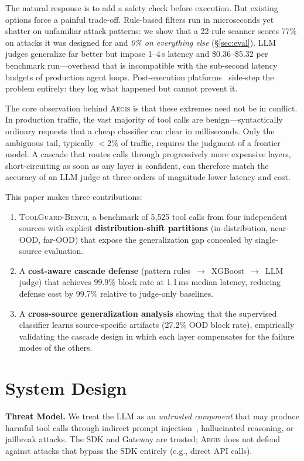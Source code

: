 \documentclass{article}
\newcommand{\system}{\textsc{Aegis}\xspace}
\newcommand{\bench}{\textsc{ToolGuard-Bench}\xspace}
\begin{document}
The natural response is to add a safety check before execution.
But existing options force a painful trade-off.
Rule-based filters run in microseconds yet shatter on unfamiliar attack patterns: we show that a 22-rule scanner scores 77\% on attacks it was designed for and \emph{0\% on everything else} (\S\ref{sec:eval}).
LLM judges generalize far better but impose 1--4\,s latency and \$0.36--\$5.32 per benchmark run---overhead that is incompatible with the sub-second latency budgets of production agent loops.
Post-execution platforms~\citep{langfuse2024,arize2024} side-step the problem entirely: they log what happened but cannot prevent it.

The core observation behind \system is that these extremes need not be in conflict.
In production traffic, the vast majority of tool calls are benign---syntactically ordinary requests that a cheap classifier can clear in milliseconds.
Only the ambiguous tail, typically $<$2\% of traffic, requires the judgment of a frontier model.
A cascade that routes calls through progressively more expensive layers, short-circuiting as soon as any layer is confident, can therefore match the accuracy of an LLM judge at three orders of magnitude lower latency and cost.

This paper makes three contributions:
\begin{enumerate}[nolistsep,leftmargin=*]
\item \bench, a benchmark of 5{,}525 tool calls from four independent sources with explicit \textbf{distribution-shift partitions} (in-distribution, near-OOD, far-OOD) that expose the generalization gap concealed by single-source evaluation.
\item A \textbf{cost-aware cascade defense} (pattern rules~$\to$~XGBoost~$\to$~LLM judge) that achieves 99.9\% block rate at 1.1\,ms median latency, reducing defense cost by 99.7\% relative to judge-only baselines.
\item A \textbf{cross-source generalization analysis} showing that the supervised classifier learns source-specific artifacts (27.2\% OOD block rate), empirically validating the cascade design in which each layer compensates for the failure modes of the others.
\end{enumerate}

\section{System Design}
\label{sec:arch}

\textbf{Threat Model.}
We treat the LLM as an \emph{untrusted component} that may produce harmful tool calls through indirect prompt injection~\citep{greshake2023not}, hallucinated reasoning, or jailbreak attacks.
The SDK and Gateway are trusted; \system does not defend against attacks that bypass the SDK entirely (e.g., direct API calls).
\end{document}
